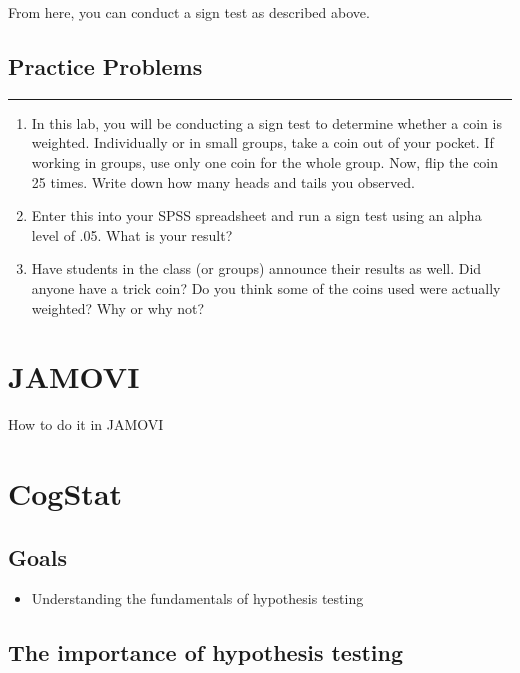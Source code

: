 \documentclass[
]{book}
\providecommand{\tightlist}{%
  \setlength{\itemsep}{0pt}\setlength{\parskip}{0pt}}
\begin{document}
From here, you can conduct a sign test as described above.

\hypertarget{practice-problems-4}{%
\subsection{Practice Problems}\label{practice-problems-4}}

\begin{center}\rule{0.5\linewidth}{0.5pt}\end{center}

\begin{enumerate}
\def\labelenumi{\arabic{enumi}.}
\item
  In this lab, you will be conducting a sign test to determine whether a coin is weighted. Individually or in small groups, take a coin out of your pocket. If working in groups, use only one coin for the whole group. Now, flip the coin 25 times. Write down how many heads and tails you observed.
\item
  Enter this into your SPSS spreadsheet and run a sign test using an alpha level of .05. What is your result?
\item
  Have students in the class (or groups) announce their results as well. Did anyone have a trick coin? Do you think some of the coins used were actually weighted? Why or why not?
\end{enumerate}

\hypertarget{jamovi-5}{%
\section{JAMOVI}\label{jamovi-5}}

How to do it in JAMOVI

\hypertarget{cogstat-6}{%
\section{CogStat}\label{cogstat-6}}

\hypertarget{goals-4}{%
\subsection{Goals}\label{goals-4}}

\begin{itemize}
\tightlist
\item
  Understanding the fundamentals of hypothesis testing
\end{itemize}

\hypertarget{the-importance-of-hypothesis-testing}{%
\subsection{The importance of hypothesis testing}\label{the-importance-of-hypothesis-testing}}
\end{document}
